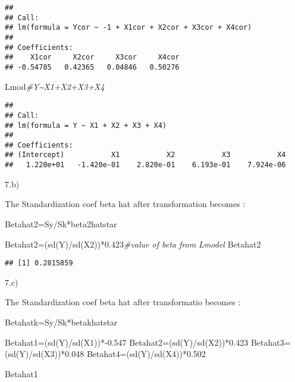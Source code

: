 \documentclass[
]{article}
\newenvironment{Shaded}{\begin{snugshade}}{\end{snugshade}}
\newcommand{\CommentTok}[1]{\textcolor[rgb]{0.56,0.35,0.01}{\textit{#1}}}
\newcommand{\FloatTok}[1]{\textcolor[rgb]{0.00,0.00,0.81}{#1}}
\newcommand{\FunctionTok}[1]{\textcolor[rgb]{0.00,0.00,0.00}{#1}}
\newcommand{\NormalTok}[1]{#1}
\newcommand{\OtherTok}[1]{\textcolor[rgb]{0.56,0.35,0.01}{#1}}
\newcommand{\SpecialCharTok}[1]{\textcolor[rgb]{0.00,0.00,0.00}{#1}}
\begin{document}
\begin{verbatim}
## 
## Call:
## lm(formula = Ycor ~ -1 + X1cor + X2cor + X3cor + X4cor)
## 
## Coefficients:
##    X1cor     X2cor     X3cor     X4cor  
## -0.54785   0.42365   0.04846   0.50276
\end{verbatim}

\begin{Shaded}
\begin{Highlighting}[]
\NormalTok{Lmod}\CommentTok{\#Y\textasciitilde{}X1+X2+X3+X4}
\end{Highlighting}
\end{Shaded}

\begin{verbatim}
## 
## Call:
## lm(formula = Y ~ X1 + X2 + X3 + X4)
## 
## Coefficients:
## (Intercept)           X1           X2           X3           X4  
##   1.220e+01   -1.420e-01    2.820e-01    6.193e-01    7.924e-06
\end{verbatim}

7.b)

The Standardization coef beta hat after transformation becomes :

Betahat2=Sy/Sk*beta2hatstar

\begin{Shaded}
\begin{Highlighting}[]
\NormalTok{Betahat2}\OtherTok{=}\NormalTok{(}\FunctionTok{sd}\NormalTok{(Y)}\SpecialCharTok{/}\FunctionTok{sd}\NormalTok{(X2))}\SpecialCharTok{*}\FloatTok{0.423}\CommentTok{\#value of beta from Lmodel}
\NormalTok{Betahat2}
\end{Highlighting}
\end{Shaded}

\begin{verbatim}
## [1] 0.2815859
\end{verbatim}

7.c)

The Standardization coef beta hat after transformatio becomes :

Betahatk=Sy/Sk*betakhatstar

\begin{Shaded}
\begin{Highlighting}[]
\NormalTok{Betahat1}\OtherTok{=}\NormalTok{(}\FunctionTok{sd}\NormalTok{(Y)}\SpecialCharTok{/}\FunctionTok{sd}\NormalTok{(X1))}\SpecialCharTok{*{-}}\FloatTok{0.547}
\NormalTok{Betahat2}\OtherTok{=}\NormalTok{(}\FunctionTok{sd}\NormalTok{(Y)}\SpecialCharTok{/}\FunctionTok{sd}\NormalTok{(X2))}\SpecialCharTok{*}\FloatTok{0.423}
\NormalTok{Betahat3}\OtherTok{=}\NormalTok{(}\FunctionTok{sd}\NormalTok{(Y)}\SpecialCharTok{/}\FunctionTok{sd}\NormalTok{(X3))}\SpecialCharTok{*}\FloatTok{0.048}
\NormalTok{Betahat4}\OtherTok{=}\NormalTok{(}\FunctionTok{sd}\NormalTok{(Y)}\SpecialCharTok{/}\FunctionTok{sd}\NormalTok{(X4))}\SpecialCharTok{*}\FloatTok{0.502}

\NormalTok{Betahat1}
\end{Highlighting}
\end{Shaded}
\end{document}
